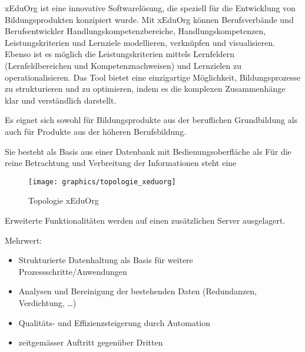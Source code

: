 
xEduOrg ist eine innovative Softwarelösung, die speziell für die Entwicklung von
Bildungsprodukten konzipiert wurde.
Mit xEduOrg können Berufsverbände und Berufsentwickler Handlungskompetenzbereiche, Handlungskompetenzen,
Leistungskriterien und Lernziele modellieren, verknüpfen und visualisieren.
Ebenso ist es möglich die Leistungskriterien mittels Lernfeldern
(Lernfeldbereichen und Kompetenznachweisen) und Lernzielen zu operationalisieren.
Das Tool bietet eine einzigartige Möglichkeit, Bildungsprozesse zu strukturieren und zu optimieren, indem es die
komplexen Zusammenhänge klar und verständlich darstellt.

Es eignet sich sowohl für Bildungsprodukte aus der beruflichen Grundbildung als auch für Produkte aus der höheren
Berufsbildung.

Sie besteht als Basis aus einer Datenbank mit Bedienungsoberfläche als
Für die reine Betrachtung und Verbreitung der Informationen steht eine

\begin{figure}[h!]
    \centering
    \texttt{[image: graphics/topologie\_xeduorg]}
    \caption{Topologie xEduOrg}
    \label{fig:topologie-xeduorg}
\end{figure}

Erweiterte Funktionalitäten werden auf einen zusätzlichen Server ausgelagert.

\linebreak
Mehrwert:

\begin{itemize}
    \item Strukturierte Datenhaltung als Basis für weitere Prozessschritte/Anwendungen
    \item Analysen und Bereinigung der bestehenden Daten (Redundanzen, Verdichtung, …)
    \item Qualitäts- und Effizienzsteigerung durch Automation
    \item zeitgemässer Auftritt gegenüber Dritten
\end{itemize}

